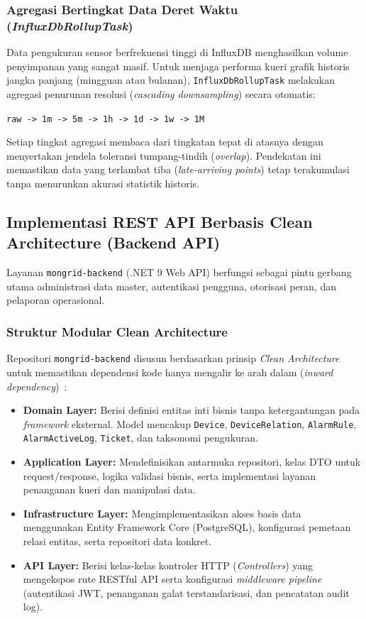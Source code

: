 \subsubsection{Agregasi Bertingkat Data Deret Waktu (\textit{InfluxDbRollupTask})}

Data pengukuran sensor berfrekuensi tinggi di InfluxDB menghasilkan volume penyimpanan yang sangat masif. Untuk menjaga performa kueri grafik historis jangka panjang (mingguan atau bulanan), \texttt{InfluxDbRollupTask} melakukan agregasi penurunan resolusi (\textit{cascading downsampling}) secara otomatis:
\begin{center}
  \texttt{raw -> 1m -> 5m -> 1h -> 1d -> 1w -> 1M}
\end{center}
Setiap tingkat agregasi membaca dari tingkatan tepat di atasnya dengan menyertakan jendela toleransi tumpang-tindih (\textit{overlap}). Pendekatan ini memastikan data yang terlambat tiba (\textit{late-arriving points}) tetap terakumulasi tanpa menurunkan akurasi statistik historis.

\subsection{Implementasi REST API Berbasis Clean Architecture (Backend API)}

Layanan \texttt{mongrid-backend} (.NET 9 Web API) berfungsi sebagai pintu gerbang utama administrasi data master, autentikasi pengguna, otorisasi peran, dan pelaporan operasional.

\subsubsection{Struktur Modular Clean Architecture}

Repositori \texttt{mongrid-backend} disusun berdasarkan prinsip \textit{Clean Architecture} untuk memastikan dependensi kode hanya mengalir ke arah dalam (\textit{inward dependency})~\cite{martin2017clean}:
\begin{itemize}[leftmargin=*, itemsep=0pt]
  \item \textbf{Domain Layer:} Berisi definisi entitas inti bisnis tanpa ketergantungan pada \textit{framework} eksternal. Model mencakup \texttt{Device}, \texttt{DeviceRelation}, \texttt{AlarmRule}, \texttt{AlarmActiveLog}, \texttt{Ticket}, dan taksonomi pengukuran.
  \item \textbf{Application Layer:} Mendefinisikan antarmuka repositori, kelas DTO untuk request/response, logika validasi bisnis, serta implementasi layanan penanganan kueri dan manipulasi data.
  \item \textbf{Infrastructure Layer:} Mengimplementasikan akses basis data menggunakan Entity Framework Core (PostgreSQL), konfigurasi pemetaan relasi entitas, serta repositori data konkret.
  \item \textbf{API Layer:} Berisi kelas-kelas kontroler HTTP (\textit{Controllers}) yang mengekspos rute RESTful API serta konfigurasi \textit{middleware pipeline} (autentikasi JWT, penanganan galat terstandarisasi, dan pencatatan audit log).
\end{itemize}

